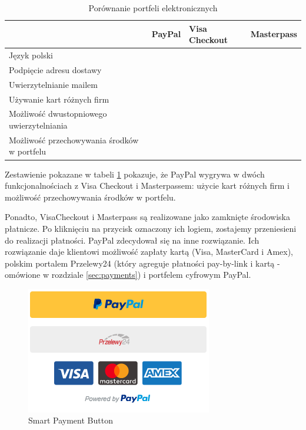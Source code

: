 \documentclass[12pt]{article}
\newcommand{\cmark}{\textcolor{green!80!black}{\ding{51}}}
\newcommand{\xmark}{\textcolor{red}{\ding{55}}}
\numberwithin{figure}{section}
\begin{document}
\begin{sloppypar}
\begin{table}[H]
    \begin{tabular}{|p{5cm}|c|c|c|}
    \hline
     & \multicolumn{1}{l|}{\textbf{PayPal}} & \multicolumn{1}{l|}{\textbf{Visa Checkout}} & \multicolumn{1}{l|}{\textbf{Masterpass}} \\ \hline
    Język polski & \cmark & \cmark & \cmark \\ \hline
    Podpięcie adresu dostawy & \cmark & \cmark & \cmark \\ \hline
    Uwierzytelnianie mailem & \cmark & \cmark & \xmark \\ \hline
    Używanie kart różnych firm & \cmark & \xmark & \xmark \\ \hline
    Możliwość dwustopniowego uwierzytelniania & \cmark & \xmark & \cmark \\ \hline
    Możliwość przechowywania środków w portfelu & \cmark & \xmark & \xmark \\ \hline
    \end{tabular}
    \caption{Porównanie portfeli elektronicznych}
    \label{tab:portfele}
\end{table}

Zestawienie pokazane w tabeli \ref{tab:portfele} pokazuje, że PayPal wygrywa w dwóch funkcjonalnościach z Visa Checkout i Masterpassem: użycie kart różnych firm i możliwość przechowywania środków w portfelu.

Ponadto, VisaCheckout i Masterpass są realizowane jako zamknięte środowiska płatnicze. Po kliknięciu na przycisk oznaczony ich logiem, zostajemy przeniesieni do realizacji płatności. PayPal zdecydował się na inne rozwiązanie. Ich rozwiązanie daje klientowi możliwość zapłaty kartą (Visa, MasterCard i Amex), polskim portalem Przelewy24 (który agreguje płatności pay-by-link i kartą - omówione w rozdziale \ref{sec:payments}) i portfelem cyfrowym PayPal. 

\begin{figure}[H] 
 	\centering
	\includegraphics[scale=1.0]{images/chapter_2/paypal-button.png}
	\caption{Smart Payment Button}
	\label{fig:paypal-button}
\end{figure}


\end{sloppypar}
\end{document}
